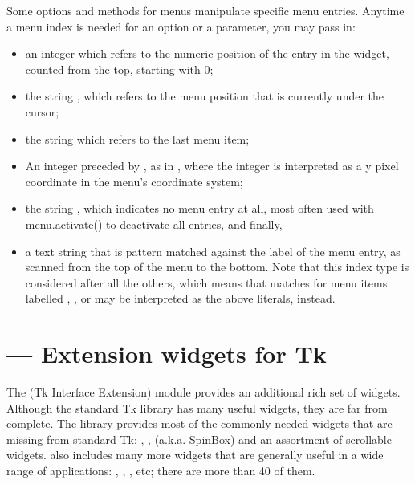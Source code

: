 \begin{description}
Some options and methods for menus manipulate specific menu entries.
Anytime a menu index is needed for an option or a parameter, you may
pass in: 
\begin{itemize}
\item   an integer which refers to the numeric position of the entry in
the widget, counted from the top, starting with 0; 
\item   the string , which refers to the menu position that is
currently under the cursor;
\item   the string  which refers to the last menu
item;  
\item   An integer preceded by , as in , where the integer is
interpreted as a y pixel coordinate in the menu's coordinate system;
\item   the string , which indicates no menu entry at all, most
often used with menu.activate() to deactivate all entries, and
finally,
\item   a text string that is pattern matched against the label of the
menu entry, as scanned from the top of the menu to the bottom.  Note
that this index type is considered after all the others, which means
that matches for menu items labelled , , or
 may be interpreted as the above literals, instead.
\end{itemize}
\end{description}


\section{ ---
         Extension widgets for Tk}



The  (Tk Interface Extension) module provides an
additional rich set of widgets. Although the standard Tk library has
many useful widgets, they are far from complete. The 
library provides most of the commonly needed widgets that are missing
from standard Tk: , , 
(a.k.a. SpinBox) and an assortment of scrollable widgets. 
also includes many more widgets that are generally useful in a wide
range of applications: , ,
, etc; there are more than 40 of them.

